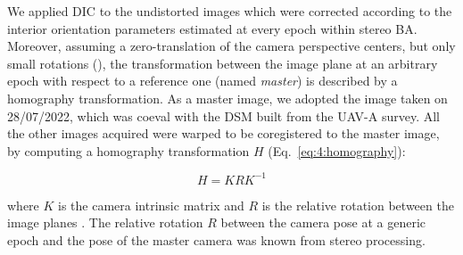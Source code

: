 

We applied DIC to the undistorted images which were corrected according to the interior
orientation parameters estimated at every epoch within stereo BA.
Moreover, assuming a zero-translation of the camera perspective centers, but only small
rotations (), the transformation between the image plane at an
arbitrary epoch with respect to a reference one (named \textit{master}) is described by a homography transformation.
As a master image, we adopted the image taken on 28/07/2022, which was
coeval with the DSM built from the UAV-A survey.
All the other images acquired were warped to be coregistered to the master image,
by computing a homography transformation \(H\) (Eq.~\ref{eq:4:homography}):

\begin{equation}
  H = KRK^{-1}
  \label{eq:4:homography}
\end{equation}

where \(K\) is the camera intrinsic matrix and \(R\) is the relative
rotation between the image planes \citep{forstner2016}.
The relative rotation \(R\) between the camera pose at a generic epoch and the pose of
the master camera was known from stereo processing.

